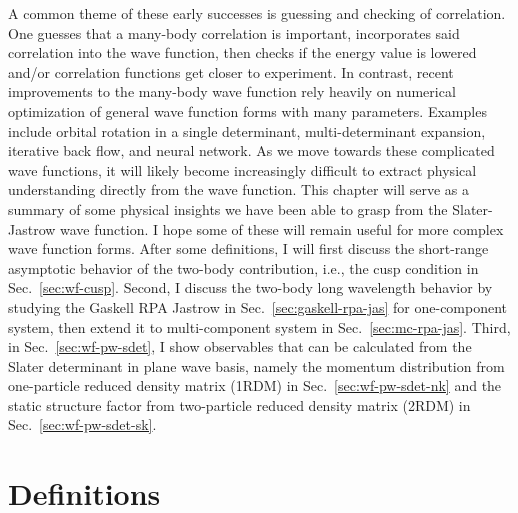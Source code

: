 A common theme of these early successes is guessing and checking of correlation. One guesses that a many-body correlation is important, incorporates said correlation into the wave function, then checks if the energy value is lowered and/or correlation functions get closer to experiment. %
In contrast, recent improvements to the many-body wave function rely heavily on numerical optimization of general wave function forms with many parameters. Examples include orbital rotation in a single determinant, multi-determinant expansion, iterative back flow, and neural network.
As we move towards these complicated wave functions, it will likely become increasingly difficult to extract physical understanding directly from the wave function.
This chapter will serve as a summary of some physical insights we have been able to grasp from the Slater-Jastrow wave function. I hope some of these will remain useful for more complex wave function forms. After some definitions, I will first discuss the short-range asymptotic behavior of the two-body contribution, i.e., the cusp condition in Sec.~\ref{sec:wf-cusp}. Second, I discuss the two-body long wavelength behavior by studying the Gaskell RPA Jastrow in Sec.~\ref{sec:gaskell-rpa-jas} for one-component system, then extend it to multi-component system in Sec.~\ref{sec:mc-rpa-jas}. Third, in Sec.~\ref{sec:wf-pw-sdet}, I show observables that can be calculated from the Slater determinant in plane wave basis, namely the momentum distribution from  one-particle reduced density matrix (1RDM) in Sec.~\ref{sec:wf-pw-sdet-nk} and the static structure factor from two-particle reduced density matrix (2RDM) in Sec.~\ref{sec:wf-pw-sdet-sk}.

\section{Definitions}

